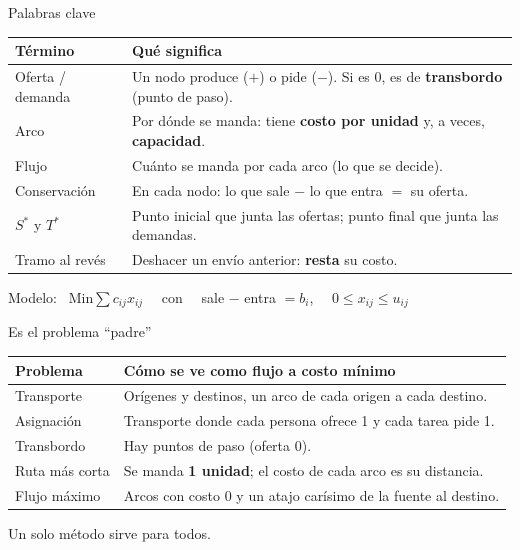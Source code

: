 \documentclass[aspectratio=169]{beamer}
\begin{document}
\begin{frame}{Palabras clave}
  \small
  \begin{tabular}{p{3.2cm}p{10cm}}
    \toprule
    \textbf{Término} & \textbf{Qué significa} \\
    \midrule
    Oferta / demanda & Un nodo produce ($+$) o pide ($-$). Si es 0, es de \textbf{transbordo} (punto de paso). \\
    Arco & Por dónde se manda: tiene \textbf{costo por unidad} y, a veces, \textbf{capacidad}. \\
    Flujo & Cuánto se manda por cada arco (lo que se decide). \\
    Conservación & En cada nodo: lo que sale $-$ lo que entra $=$ su oferta. \\
    $S^*$ y $T^*$ & Punto inicial que junta las ofertas; punto final que junta las demandas. \\
    Tramo al revés & Deshacer un envío anterior: \textbf{resta} su costo. \\
    \bottomrule
  \end{tabular}
  \bigskip

  \centering
  Modelo: \ $\text{Min} \sum c_{ij}x_{ij}$ \ \ con \ \ sale $-$ entra $= b_i$, \ \ $0 \le x_{ij} \le u_{ij}$
\end{frame}

\begin{frame}{Es el problema ``padre''}
  \small
  \begin{tabular}{p{2.8cm}p{10.4cm}}
    \toprule
    \textbf{Problema} & \textbf{Cómo se ve como flujo a costo mínimo} \\
    \midrule
    Transporte & Orígenes y destinos, un arco de cada origen a cada destino. \\
    Asignación & Transporte donde cada persona ofrece 1 y cada tarea pide 1. \\
    Transbordo & Hay puntos de paso (oferta 0). \\
    Ruta más corta & Se manda \textbf{1 unidad}; el costo de cada arco es su distancia. \\
    Flujo máximo & Arcos con costo 0 y un atajo carísimo de la fuente al destino. \\
    \bottomrule
  \end{tabular}
  \bigskip

  \centering Un solo método sirve para todos.
\end{frame}
\end{document}
